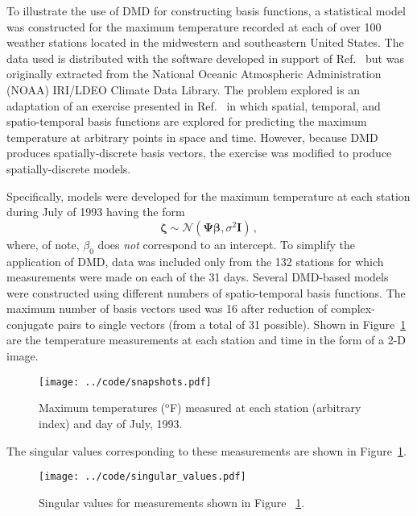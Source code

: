 \documentclass[review,number,sort&compress,12pt]{elsarticle}
\begin{document}
To illustrate the use of DMD for constructing basis functions, a statistical model was constructed for the maximum temperature recorded at each of over 100 weather stations located in the midwestern and southeastern United States. 
The data used is distributed with the software developed in support of Ref.~\cite{wikle2019sts} but was originally extracted from the National Oceanic Atmospheric Administration (NOAA) IRI/LDEO Climate Data Library.
The problem explored  is an adaptation of an exercise presented in Ref.~\cite{wikle2019sts} in which spatial, temporal, and spatio-temporal basis functions are explored for predicting the maximum temperature at arbitrary points in space and time.
However, because DMD produces spatially-discrete basis vectors, the exercise was modified to produce spatially-discrete models.

Specifically, models were developed for the maximum temperature at each station during July of 1993 having the form
\begin{equation}
 \boldsymbol{\zeta} \sim \mathcal{N}(\boldsymbol{\Psi}\boldsymbol{\beta}, \sigma^2 \mathbf{I}) \, ,
\end{equation}
where, of note, $\beta_0$ does {\it not} correspond to an intercept.
To simplify the application of DMD, data was included only from the 132 stations for which measurements were made on each of the 31 days.
Several DMD-based models were constructed using different numbers of spatio-temporal basis functions.  
The maximum number of basis vectors used was 16 after reduction of complex-conjugate pairs to single vectors (from a total of 31 possible).  
Shown in Figure~\ref{fig:snapshots} are the temperature measurements at each station and time in the form of a 2-D image.
\begin{figure}[h]
 \centering
 \texttt{[image: ../code/snapshots.pdf]}\\
   \caption{Maximum temperatures ($^\text{o}$F) measured at each station (arbitrary index) and day of July, 1993.}
  \label{fig:snapshots}
\end{figure}
The singular values corresponding to these measurements are shown in Figure~\ref{fig:snapshots}.
\begin{figure}[h]
 \centering
 \texttt{[image: ../code/singular\_values.pdf]}\\
   \caption{Singular values for measurements shown in Figure ~\ref{fig:snapshots}.}
  \label{fig:singular_values}
\end{figure}
\end{document}
